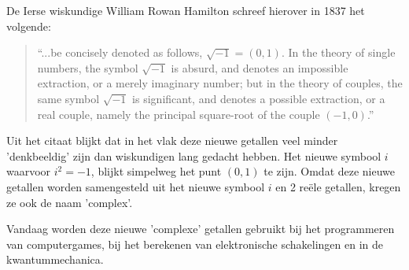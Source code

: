 \documentclass{ximera}
\begin{document}
De Ierse wiskundige William Rowan Hamilton schreef hierover in 1837 het volgende: 

\begin{quote}
    “...be concisely denoted as follows, \(\sqrt{-1} = (0, 1)\). In the theory of single numbers, the symbol \(\sqrt{-1}\) is absurd, and denotes an impossible extraction, or a merely imaginary number; but in the theory of couples, the same symbol \(\sqrt{-1}\) is significant, and denotes a possible extraction, or a real couple, namely the principal square-root of the couple \((-1,0)\).”
\end{quote}



Uit het citaat blijkt dat in het vlak deze nieuwe getallen veel minder 'denkbeeldig' zijn dan wiskundigen lang gedacht hebben. Het nieuwe symbool \(i\) waarvoor \(i^2 = -1\),  blijkt simpelweg het punt \((0,1)\) te zijn. Omdat deze nieuwe getallen worden samengesteld uit het nieuwe symbool \(i\) en 2 reële getallen, kregen ze ook de naam 'complex'. 

Vandaag worden deze nieuwe 'complexe' getallen gebruikt bij het programmeren van computergames, bij het berekenen van elektronische schakelingen en in de kwantummechanica.
\end{document}
